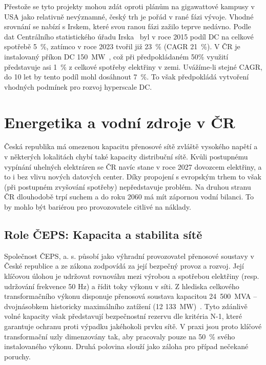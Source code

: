 Přestože se tyto projekty mohou zdát oproti plánům na gigawattové kampusy v USA jako relativně nevýznamné, český trh je pořád v rané fázi vývoje. Vhodné srovnání se nabízí s Irskem, které svou ranou fázi zažilo teprve nedávno. Podle dat Centrálního statistického úřadu Irska~\cite{central_statistics_office_ireland_share_2024} byl v roce 2015 podíl DC na celkové spotřebě 5~\%, zatímco v roce 2023 tvořil již 23~\% (CAGR 21~\%). V ČR je instalovaný příkon DC 150~MW~\cite{mordor_intelligence_czechia_2025}, což při předpokládaném 50\% využití představuje asi 1~\% z celkové spotřeby elektřiny v zemi. Uvážíme-li stejné CAGR, do 10 let by tento podíl mohl dosáhnout 7~\%. To však předpokládá vytvoření vhodných podmínek pro rozvoj hyperscale DC.

\section{Energetika a vodní zdroje v ČR}
\label{sec:cz_energie}


Česká republika má omezenou kapacitu přenosové sítě zvláště vysokého napětí a v některých lokalitách chybí také kapacity distribuční sítě. Kvůli postupnému vypínání uhelných elektráren se ČR navíc stane v roce 2027 dovozcem elektřiny, a to i bez vlivu nových datových center. Díky propojení s evropským trhem to však (při postupném zvyšování spotřeby) nepředstavuje problém. Na druhou stranu ČR dlouhodobě trpí suchem a do roku 2060 má mít zápornou vodní bilanci. To by mohlo být bariérou pro provozovatele citlivé na náklady.

\subsection{Role ČEPS: Kapacita a stabilita sítě}
\label{subsec:cz_energie_ceps}

Společnost ČEPS, a. s. působí jako výhradní provozovatel přenosové soustavy v České republice a ze zákona zodpovídá za její bezpečný provoz a rozvoj. Její klíčovou úlohou je udržovat rovnováhu mezi výrobou a spotřebou elektřiny (resp. udržování frekvence 50 Hz) a řídit toky výkonu v síti. Z hlediska celkového transformačního výkonu disponuje přenosová soustava kapacitou 24~500~MVA
\cite[s.~127]{bartos_energetika_2025} -- dvojnásobkem historicky maximálního zatížení (12 133~MW)~\cite[s.~148]{bartos_energetika_2025}. Tyto zdánlivě volné kapacity však představují bezpečnostní rezervu dle kritéria N-1, které garantuje ochranu proti výpadku jakéhokoli prvku sítě. V praxi jsou proto klíčové transformační uzly dimenzovány tak, aby pracovaly pouze na 50~\% svého instalovaného výkonu. Druhá polovina slouží jako záloha pro případ nečekané poruchy.~\cite{bartos_energetika_2025}

